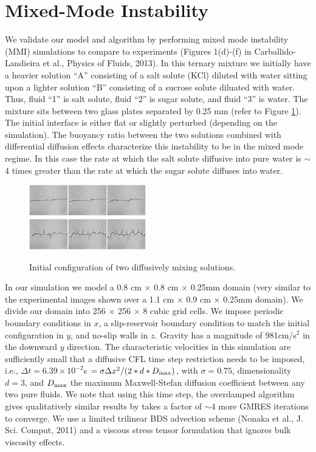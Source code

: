 \documentclass[final]{siamltex}
\begin{document}
\section{Mixed-Mode Instability}
We validate our model and algorithm by performing mixed mode instability (MMI) simulations to compare to experiments 
(Figures 1(d)-(f) in Carballido-Landieira et al., Physics of Fluids, 2013).  In this ternary mixture
we initially have a heavier solution ``A'' consisting of a salt solute (KCl) diluted with water sitting upon
a lighter solution ``B'' consisting of a sucrose solute diluated with water.  
Thus, fluid ``1'' is salt solute, fluid ``2'' is sugar solute, and fluid ``3'' is water.
The mixture sits between two glass plates separated by 0.25 mm (refer to Figure \ref{fig:mmi}).
The initial interface is either flat or slightly perturbed (depending
on the simulation).  The buoyancy ratio between the two solutions combined with 
differential diffusion effects characterize this instability to be in the mixed mode
regime.  In this case the rate at which the salt solute diffusive into pure water is $\sim$4 times greater 
than the rate at which the sugar solute diffuses into water.
\begin{figure}[hb]
\centering
\includegraphics[width=2in]{mmi}
\label{fig:mmi}
\caption{Initial configuration of two diffusively mixing solutions.}
\end{figure}

In our simulation we model a 0.8 cm $\times$ 0.8 cm $\times$ 0.25mm domain (very similar to the experimental
images shown over a 1.1 cm $\times$ 0.9 cm $\times$ 0.25mm domain).  We divide our domain into 
256 $\times$ 256 $\times$ 8 cubic grid cells.  We impose periodic boundary conditions in $x$,
a slip-reservoir boundary condition to match the initial configuration in $y$, and no-slip walls in $z$.
Gravity has a magnitude of 981cm/s$^2$ in the downward $y$ direction.  The characteristic velocities in
this simulation are sufficiently small that a diffusive CFL time step restriction needs to be imposed, i.e.,
$\Delta t = 6.39 \times 10^{-2}$s $= \sigma\Delta x^2/(2*d*D_{\rm max})$, with $\sigma=0.75$, 
dimensionality $d=3$, and $D_{\rm max}$ the maximum Maxwell-Stefan diffusion coefficient between any two pure
fluids.  We note that using this time step, the overdamped algorithm gives qualitatively
similar results by takes a factor of $\sim$4 more GMRES iterations to converge.  We use a limited trilinear
BDS advection scheme (Nonaka et al., J. Sci. Comput, 2011) and a viscous stress tensor formulation that 
ignores bulk viscosity effects.
\end{document}
